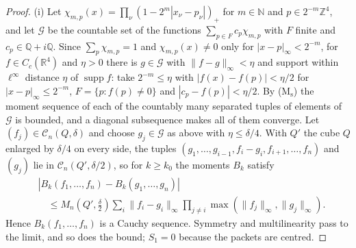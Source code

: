 \documentclass[aps,prd,twocolumn,superscriptaddress,nofootinbib,longbibliography,floatfix,amsmath,amssymb,10pt]{revtex4-2}
\theoremstyle{definition}
\theoremstyle{remark}
\newcommand{\R}{\mathbb{R}}
\newcommand{\Z}{\mathbb{Z}}
\begin{document}
\begin{proof}
(i) Let $\chi_{m,p}(x)=\prod_\nu(1-2^m|x_\nu-p_\nu|)_+$ for $m\in\mathbb N$
and $p\in2^{-m}\Z^4$, and let $\mathcal G$ be the countable set of the
functions $\sum_{p\in F}c_p\chi_{m,p}$ with $F$ finite and $c_p\in\mathbb
Q+i\mathbb Q$. Since $\sum_p\chi_{m,p}=1$ and $\chi_{m,p}(x)\ne0$ only for
$|x-p|_\infty<2^{-m}$, for $f\in C_c(\R^4)$ and $\eta>0$ there is
$g\in\mathcal G$ with $\|f-g\|_\infty<\eta$ and support within $\ell^\infty$
distance $\eta$ of $\operatorname{supp}f$: take $2^{-m}\le\eta$ with
$|f(x)-f(p)|<\eta/2$ for $|x-p|_\infty\le2^{-m}$, $F=\{p:f(p)\ne0\}$ and
$|c_p-f(p)|<\eta/2$. By (M$_{\mathrm s}$) the moment sequence of each of the
countably many separated tuples of elements of $\mathcal G$ is bounded, and
a diagonal subsequence makes all of them converge. Let $(f_j)\in\mathcal
C_n(Q,\delta)$ and choose $g_j\in\mathcal G$ as above with $\eta\le\delta/4$.
With $Q'$ the cube $Q$ enlarged by $\delta/4$ on every side, the tuples
$(g_1,\dots,g_{i-1},f_i-g_i,f_{i+1},\dots,f_n)$ and $(g_j)$ lie in
$\mathcal C_n(Q',\delta/2)$, so for $k\ge k_0$ the moments $B_k$ satisfy
\[
\begin{split}
&|B_k(f_1,\dots,f_n)-B_k(g_1,\dots,g_n)|\\
&\quad\le M_n(Q',\tfrac\delta2)\sum_i\|f_i-g_i\|_\infty\prod_{j\ne i}
\max(\|f_j\|_\infty,\|g_j\|_\infty).
\end{split}
\]
Hence $B_k(f_1,\dots,f_n)$ is a Cauchy sequence. Symmetry and multilinearity
pass to the limit, and so does the bound; $S_1=0$ because the packets are
centred.


\end{proof}
\end{document}
